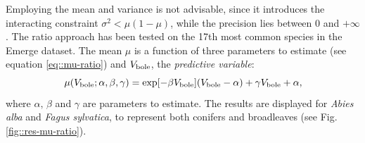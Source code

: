 Employing the mean and variance is not advisable, since it introduces the interacting constraint \( \sigma^2 < \mu (1 - \mu) \), while the precision lies between 0 and \( + \infty \). The ratio approach has been tested on the 17\textup{th} most common species in the Emerge dataset. The mean \( \mu \) is a function of three parameters to estimate (see equation \eqref{eq::mu-ratio}) and \( V_{\text{bole}} \), the \textit{predictive variable}:
\begin{equation}
	\mu(V_{\text{bole}}; \alpha, \beta, \gamma) = \exp[-\beta V_{\text{bole}}] (V_{\text{bole}} - \alpha) + \gamma V_{\text{bole}} + \alpha,
	\label{eq::mu-ratio}
\end{equation}
where \( \alpha, \, \beta\) and \( \gamma \) are parameters to estimate. The results are displayed for \textit{Abies alba} and \textit{Fagus sylvatica}, to represent both conifers and broadleaves (see Fig. \ref{fig::res-mu-ratio}).

